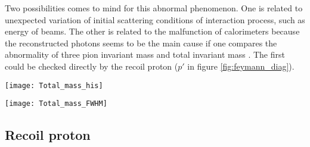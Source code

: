 Two possibilities comes to mind for this abnormal phenomenon. One is related to unexpected variation of initial scattering conditions of interaction process, such as energy of beams. The other is related to the malfunction of calorimeters because the reconstructed photons seems to be the main cause if one compares the abnormality of three pion invariant mass and total invariant mass . The first could be checked directly by the recoil proton ($p'$ in figure \ref{fig:feymann_diag}).

\begin{figure*}[!ht]
	\centering
	\vspace{2cm}
	\texttt{[image: Total\_mass\_his]}
	\caption{Histogram of the total invariant mass distribution. The colors inside the histogram represent the number of events corresponding to the run number and invariant mass. To see the disparities of each run more clearly, the distribution of invariant mass is normalized with maximum value fixed to be 1000. In the red dashed rectangles, it can be seen that the red strokes are much longer than the normal runs.}
	\label{fig:Total_mass_his}
	\vspace{2 cm}
	
	\texttt{[image: Total\_mass\_FWHM]}
	\caption{Value of full width at half maximum of the total invariant distribution for each run. The typical value of FWHM for a normal run is around \SI{1.5}{\giga\electronvolt}.There are several outliners that have much bigger FWHM than the usual ones. Also there is a range of runs 70223 $\sim$ 70240 that have a slightly smaller value of FWHM value. }
	\label{fig:Total_mass_FWHM}
	\vspace{3cm}
\end{figure*}

\subsection{Recoil proton}

